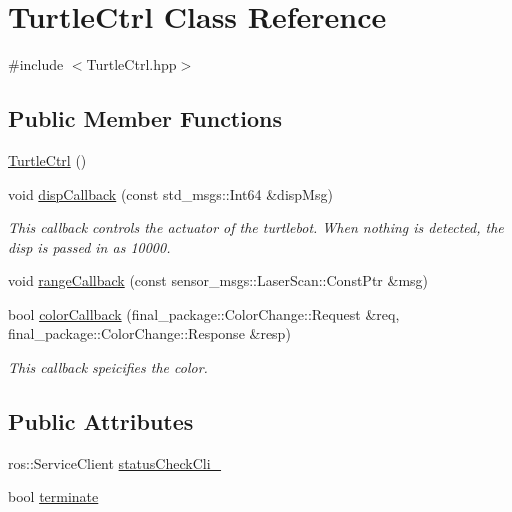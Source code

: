 \hypertarget{classTurtleCtrl}{}\section{Turtle\+Ctrl Class Reference}
\label{classTurtleCtrl}


{\ttfamily \#include $<$Turtle\+Ctrl.\+hpp$>$}

\subsection*{Public Member Functions}
\begin{DoxyCompactItemize}
\item 
\hyperlink{classTurtleCtrl_ad74e99396945d2234307c91467baab2b}{Turtle\+Ctrl} ()
\item 
void \hyperlink{classTurtleCtrl_aa5c2960884f7c171bee34ac1f0d867c6}{disp\+Callback} (const std\+\_\+msgs\+::\+Int64 \&disp\+Msg)
\begin{DoxyCompactList}\small\item\em This callback controls the actuator of the turtlebot. When nothing is detected, the disp is passed in as 10000. \end{DoxyCompactList}\item 
void \hyperlink{classTurtleCtrl_ae68f9b9b0f40ae07d68332625ac75440}{range\+Callback} (const sensor\+\_\+msgs\+::\+Laser\+Scan\+::\+Const\+Ptr \&msg)
\item 
bool \hyperlink{classTurtleCtrl_aa803104f5e820d420927df598e48f924}{color\+Callback} (final\+\_\+package\+::\+Color\+Change\+::\+Request \&req, final\+\_\+package\+::\+Color\+Change\+::\+Response \&resp)
\begin{DoxyCompactList}\small\item\em This callback speicifies the color. \end{DoxyCompactList}\end{DoxyCompactItemize}
\subsection*{Public Attributes}
\begin{DoxyCompactItemize}
\item 
ros\+::\+Service\+Client \hyperlink{classTurtleCtrl_aa9a72ccbacd4c55c356ba0305ba14a4a}{status\+Check\+Cli\+\_\+}
\item 
bool \hyperlink{classTurtleCtrl_a0022c4d538eef753a0d49d4dfbdd4549}{terminate}
\end{DoxyCompactItemize}


